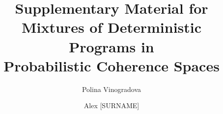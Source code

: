 \documentclass[runningheads]{llncs}
\newif\ifanonymous
\begin{document}
\title{Supplementary Material for\\ Mixtures of Deterministic Programs in\\
Probabilistic Coherence Spaces}
\ifanonymous
\author{Anonymous Author(s)}
\authorrunning{Anonymous}
\institute{Anonymous Institution}
\else
\author{Polina Vinogradova \and Alex [SURNAME]}
\institute{[AFFILIATION 1] \and [AFFILIATION 2]}
\fi
\maketitle


\end{document}
